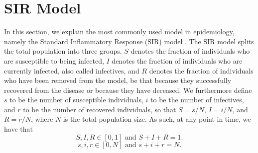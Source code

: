 \documentclass[12pt]{article}
\begin{document}
	
	
	
	\section{SIR Model}\label{sec:sir_model}
	In this section, we explain the most commonly used model in epidemiology, namely the Standard Inflammatory Response (SIR) model \parencite{kermack1927contribution, anderson1992infectious}. The SIR model splits the total population into three groups. $S$ denotes the fraction of individuals who are susceptible to being infected, $I$ denotes the fraction of individuals who are currently infected, also called infectives, and $R$ denotes the fraction of individuals who have been removed from the model, be that because they successfully recovered from the disease or because they have deceased. We furthermore define $s$ to be the number of susceptible individuals, $i$ to be the number of infectives, and $r$ to be the number of recovered individuals, so that $S = s/N$, $I = i/N$, and $R = r/N$, where $N$ is the total population size. As such, at any point in time, we have that
	    \[S,I,R \in [0,1] \text{ and } S+I+R=1.\]
	    \[s,i,r \in [0,N] \text{ and } s+i+r=N.\]
	
\end{document}
